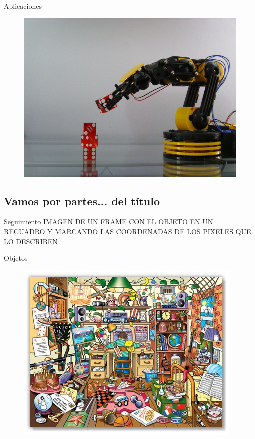 \documentclass[]{beamer}
\begin{document}
\begin{frame}{Aplicaciones}
    \begin{figure}[t]
        \centering
        \includegraphics[scale=0.12]{img/robot.jpg}
    \end{figure}
\end{frame}

\subsection{Vamos por partes... del título}
\begin{frame}{Seguimiento}
    IMAGEN DE UN FRAME CON EL OBJETO EN UN RECUADRO Y MARCANDO LAS COORDENADAS
    DE LOS PIXELES QUE LO DESCRIBEN
\end{frame}



\begin{frame}{Objetos}
    \begin{figure}[t]
        \centering
        \includegraphics[scale=0.6]{img/escena_con_objetos.jpg}
    \end{figure}
\end{frame}
\end{document}
